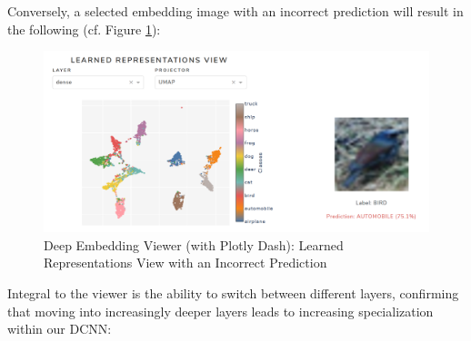 \vspace{0.2cm}

Conversely, a selected embedding image with an incorrect prediction will result in the following (cf. Figure \ref{fig:HRV_016_DEV_Image_Viewer_2}):

\vspace{0.2cm}

\begin{figure}[H]
	\centering
	\includegraphics[scale=0.55]{images/embedding_view/HRV_Fig_016_DEV_Layer_Embedding_1.PNG}
	\caption{Deep Embedding Viewer (with Plotly Dash): Learned Representations View with an Incorrect Prediction}
	\label{fig:HRV_016_DEV_Image_Viewer_2}
\end{figure}

\vspace{0.2cm}

Integral to the viewer is the ability to switch between different layers, confirming that moving into increasingly deeper layers leads to increasing specialization within our DCNN:



\vspace{0.4cm}

